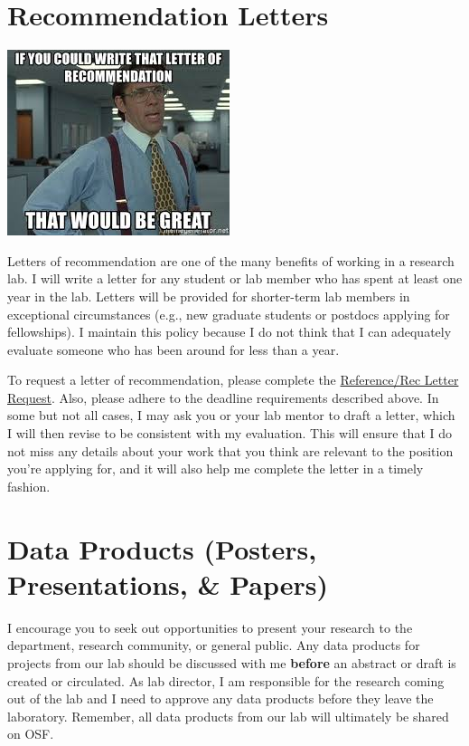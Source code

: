 \documentclass[]{book}
\begin{document}
\hypertarget{recommendation-letters}{%
\section{Recommendation Letters}\label{recommendation-letters}}

\includegraphics{images/recletter.jpg}

Letters of recommendation are one of the many benefits of working in a research lab. I will write a letter for any student or lab member who has spent at least one year in the lab. Letters will be provided for shorter-term lab members in exceptional circumstances (e.g., new graduate students or postdocs applying for fellowships). I maintain this policy because I do not think that I can adequately evaluate someone who has been around for less than a year.

To request a letter of recommendation, please complete the \href{https://docs.google.com/forms/d/1F_NeLFXH7F3mjJD0l_cS1RFaUSOPS_IdfeT4KvJvLgU/edit}{Reference/Rec Letter Request}. Also, please adhere to the deadline requirements described above. In some but not all cases, I may ask you or your lab mentor to draft a letter, which I will then revise to be consistent with my evaluation. This will ensure that I do not miss any details about your work that you think are relevant to the position you're applying for, and it will also help me complete the letter in a timely fashion.

\hypertarget{data-products-posters-presentations-papers}{%
\section{Data Products (Posters, Presentations, \& Papers)}\label{data-products-posters-presentations-papers}}

I encourage you to seek out opportunities to present your research to the department, research community, or general public. Any data products for projects from our lab should be discussed with me \textbf{before} an abstract or draft is created or circulated. As lab director, I am responsible for the research coming out of the lab and I need to approve any data products before they leave the laboratory. Remember, all data products from our lab will ultimately be shared on OSF.
\end{document}

